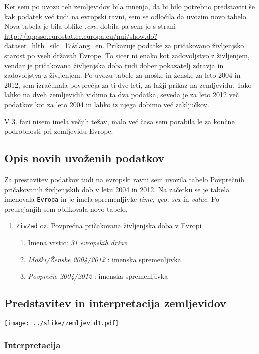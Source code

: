 \documentclass[11pt,a4paper]{article}
\begin{document}
Ker sem po uvozu teh zemljevidov bila mnenja, da bi bilo potrebno predstaviti še kak podatek več tudi na evropski ravni, sem se odločila da uvozim novo tabelo. Nova tabela je bila oblike \textit{.csv}, dobila pa sem jo s strani \url{http://appsso.eurostat.ec.europa.eu/nui/show.do?dataset=hlth_silc_17&lang=en}. Prikazuje podatke za pri\-ča\-ko\-va\-no življenjsko starost po vseh državah Evrope. To sicer ni enako kot zadovoljstvo z življenjem, vendar je pričakovana življenjska doba tudi dober pokazatelj zdravja in zadovoljstva z življenjem. Po uvozu tabele za moške in ženske za leto 2004 in 2012, sem izračunala povprečja za ti dve leti, za lažji prikaz na zemljevidu.  Tako lahko na dveh zemljevidih vidimo ta dva podatka, seveda je za leto 2012 več podatkov kot za leto 2004 in lahko iz njega dobimo več zaključkov.

V 3. fazi nisem imela večjih težav, malo več časa sem porabila le za končne podrobnosti pri zemljevidu Evrope.
\subsection{Opis novih uvoženih podatkov}
Za prestavitev podatkov tudi na evropski ravni sem uvozila tabelo Povprečnih pričakovanih življenjskih dob v letu 2004 in 2012. Na začetku se je tabela imenovala \verb+Evropa+ in je imela spremenljivke \textit{time, geo, sex} in \textit{value}. Po preurejanjih sem oblikovala novo tabelo.
\begin{enumerate}
\item \verb+ZivZad+ oz. Povprečna pričakovana življenjska doba v Evropi
\begin{enumerate}
\item Imena vrstic: \textit{31 evropskih držav}
\item \textit{Moški/Ženske 2004/2012} : imenska spremenljivka
\item \textit{Povprečje 2004/2012} : imenska spremenljivka
\end{enumerate}
\end{enumerate}
\subsection{Predstavitev in interpretacija zemljevidov}
\texttt{[image: ../slike/zemljevid1.pdf]}
\subsubsection{Interpretacija}

\end{document}
